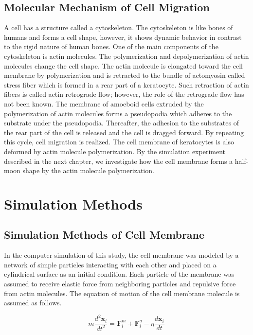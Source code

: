 \documentclass[a4paper,12pt, oneside]{book}
\begin{document}
\section{Molecular Mechanism of Cell Migration}
A cell has a structure called a cytoskeleton.
The cytoskeleton is like bones of humans and forms a cell shape, however, it shows dynamic behavior  in contrast to the rigid nature of human bones.
One of the  main components of the cytoskeleton is actin molecules.
The polymerization and depolymerization of actin molecules change the cell shape.
The actin molecule is elongated toward the cell membrane by polymerization and is retracted to the bundle of actomyosin called stress fiber which is formed in a rear part of a keratocyte.
Such retraction of actin fibers is called actin retrograde flow; however, the role of the retrograde flow has not been known.
The membrane of amoeboid cells extruded by the polymerization of actin molecules forms a pseudopodia which  adheres to the substrate under the pseudopodia.
Thereafter, the adhesion to the substrates of the rear part of the cell is released and the cell is dragged forward.
By repeating this cycle, cell migration is realized.
The cell membrane of keratocytes is also deformed by actin molecule polymerization.
By the simulation experiment described in the next chapter, we investigate how the cell membrane forms a half-moon shape by the actin molecule polymerization. 
\chapter{Simulation Methods}
\section{Simulation Methods of Cell Membrane}
In the computer simulation of this study, the cell membrane was modeled by a network of simple particles interacting with each other and placed on a cylindrical surface as an initial condition.
Each particle of the membrane was assumed to receive elastic force from neighboring particles and repulsive force from actin molecules.
The equation of motion of the cell membrane molecule is assumed as follows.

\begin{equation}
m\frac{d^2\bm{x}_i}{dt^2} = \bm{F}^m_i +  \bm{F}^a_i - \eta \frac{d\bm{x}_i}{dt}
\end{equation}
\end{document}
